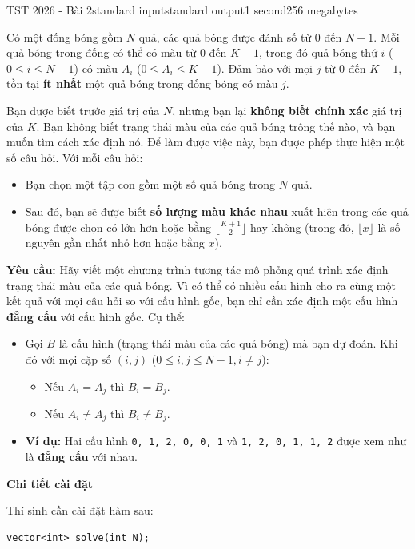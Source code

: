 \begin{problem}{TST 2026 - Bài 2}{standard input}{standard output}{1 second}{256 megabytes}

Có một đống bóng gồm $N$ quả, các quả bóng được đánh số từ $0$ đến $N-1$. Mỗi quả bóng trong đống có thể có màu từ $0$ đến $K-1$, trong đó quả bóng thứ $i$ ($0\le i\le N-1$) có màu $A_i$ ($0\le A_i\le K-1$). Đảm bảo với mọi $j$ từ $0$ đến $K-1$, tồn tại \textbf{ít nhất} một quả bóng trong đống bóng có màu $j$.

Bạn được biết trước giá trị của $N$, nhưng bạn lại \textbf{không biết chính xác} giá trị của $K$. Bạn không biết trạng thái màu của các quả bóng trông thế nào, và bạn muốn tìm cách xác định nó. Để làm được việc này, bạn được phép thực hiện một số câu hỏi. Với mỗi câu hỏi:
\begin{itemize}
   \item Bạn chọn một tập con gồm một số quả bóng trong $N$ quả.
   \item Sau đó, bạn sẽ được biết \textbf{số lượng màu khác nhau} xuất hiện trong các quả bóng được chọn có lớn hơn hoặc bằng $\lfloor \frac{K+1}2\rfloor$ hay không (trong đó, $\lfloor x\rfloor$ là số nguyên gần nhất nhỏ hơn hoặc bằng $x$).
\end{itemize}

\textbf{Yêu cầu:} Hãy viết một chương trình tương tác mô phỏng quá trình xác định trạng thái màu của các quả bóng. Vì có thể có nhiều cấu hình cho ra cùng một kết quả với mọi câu hỏi so với cấu hình gốc, bạn chỉ cần xác định một cấu hình \textbf{đẳng cấu} với cấu hình gốc. Cụ thể:
\begin{itemize}
   \item Gọi $B$ là cấu hình (trạng thái màu của các quả bóng) mà bạn dự đoán. Khi đó với mọi cặp số $(i,j)$ ($0\le i,j\le N-1,i\ne j$):
   \begin{itemize}
      \item Nếu $A_i=A_j$ thì $B_i=B_j$.
      \item Nếu $A_i\ne A_j$ thì $B_i\ne B_j$.
   \end{itemize}
   \item \textbf{Ví dụ:} Hai cấu hình \texttt{{0, 1, 2, 0, 0, 1}} và \texttt{{1, 2, 0, 1, 1, 2}} được xem như là \textbf{đẳng cấu} với nhau.
\end{itemize}

\InputFile
\textbf{Chi tiết cài đặt}

Thí sinh cần cài đặt hàm sau:

\begin{lstlisting}
vector<int> solve(int N);
\end{lstlisting}


\end{problem}
